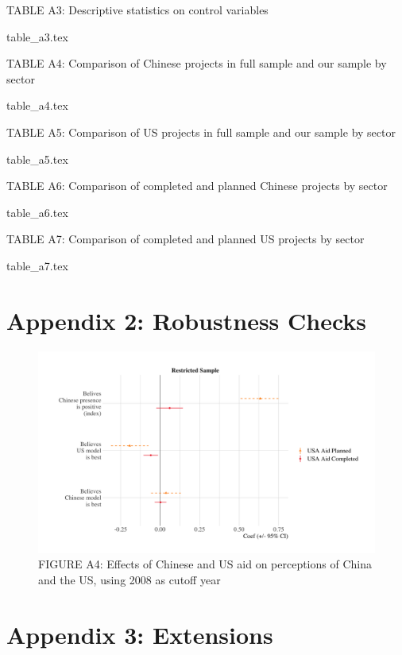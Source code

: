 \documentclass[9pt]{article}
\begin{document}
\setlength{\tabcolsep}{5pt}
\begin{table}[H]
\caption{TABLE A3: Descriptive statistics on control variables}
\label{reg}
\centering
{table_a3.tex}
\end{table}

\setlength{\tabcolsep}{5pt}
\begin{table}[H]
\caption{TABLE A4: Comparison of Chinese projects in full sample and our sample by sector}
\label{reg}
\centering
{table_a4.tex}
\end{table}

\setlength{\tabcolsep}{5pt}
\begin{table}[H]
\caption{TABLE A5: Comparison of US projects in full sample and our sample by sector}
\label{reg}
\centering
{table_a5.tex}
\end{table}

\setlength{\tabcolsep}{5pt}
\begin{table}[H]
\caption{TABLE A6: Comparison of completed and planned Chinese projects by sector}
\label{reg}
\centering
{table_a6.tex}
\end{table}

\setlength{\tabcolsep}{5pt}
\begin{table}[H]
\caption{TABLE A7: Comparison of completed and planned US projects by sector}
\label{reg}
\centering
{table_a7.tex}
\end{table}

\newpage
\section{Appendix 2: Robustness Checks}

\begin{figure}[H]
\centering
\includegraphics[width=1\textwidth]{figures/figure_a4.png}
\caption{FIGURE A4: Effects of Chinese and US aid on perceptions of China and the US, using 2008 as cutoff year}
\end{figure}

\newpage
\section{Appendix 3: Extensions}
\end{document}
